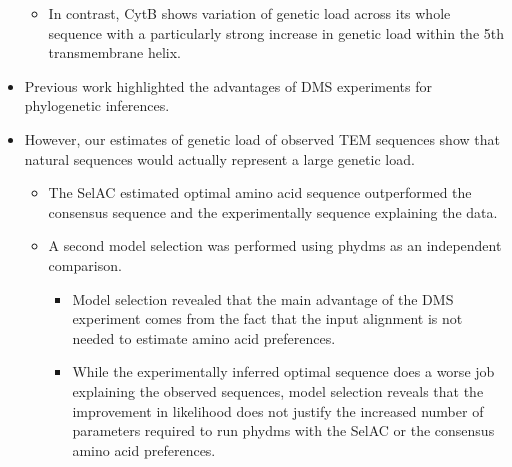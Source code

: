 \documentclass[12pt]{article}
\begin{document}
\begin{itemize}
\begin{itemize}
		\item In contrast, CytB shows variation of genetic load across its whole sequence with a particularly strong increase in genetic load within the 5th transmembrane helix.
	\end{itemize}
	\item Previous work highlighted the advantages of DMS experiments for phylogenetic inferences.
	\item However, our estimates of genetic load of observed TEM sequences show that natural sequences would actually represent a large genetic load.
	\begin{itemize}
		\item The SelAC estimated optimal amino acid sequence outperformed the consensus sequence and the experimentally sequence explaining the data. 
		\item A second model selection was performed using phydms as an independent comparison.
		\begin{itemize}
			\item Model selection revealed that the main advantage of the DMS experiment comes from the fact that the input alignment is not needed to estimate amino acid preferences.
			\item While the experimentally inferred optimal sequence does a worse job explaining the observed sequences, model selection reveals that the improvement in likelihood does not justify the increased number of parameters required to run phydms with the SelAC or the consensus amino acid preferences.
		\end{itemize}
	\end{itemize}
\end{itemize}
\end{document}
